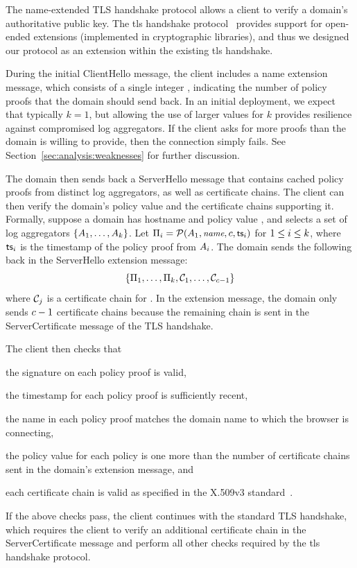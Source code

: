 The \ac{name}-extended TLS handshake protocol allows a client to verify a
domain's authoritative public key. The \ac{tls} handshake
protocol~\cite{rfc5246} provides support for open-ended extensions (implemented
in cryptographic libraries), and thus we designed our protocol as an extension
within the existing \ac{tls} handshake.

During the initial
  ClientHello message, the client includes a \ac{name} extension message, which
  consists of a single integer \numlas, indicating the number of policy proofs
  that the domain should send back.
In an initial deployment, we expect that typically $k=1$, but allowing the use
of larger values for $k$ provides resilience against compromised log
aggregators.  
If the client asks for more proofs than the domain is willing to provide,
then the connection simply fails.
See Section~\ref{sec:analysis:weaknesses} for further discussion.

The domain then sends back a ServerHello message that contains
cached policy proofs from \numlas distinct log aggregators, as well as \policy
certificate chains.  The client can then verify the domain's policy value
and the certificate chains supporting it. Formally, suppose a domain has
hostname \hostname and policy value \policy, and selects a set of log
aggregators $\{A_1, \ldots, A_k\}$. Let $\Pi_i =
\mathcal{P}(A_1, \small{\emph{name}}, c, \textsf{ts}_i)$ for $1 \le i \le
k$, where $\textsf{ts}_i$ is the timestamp of the policy proof from
$A_i$. The domain sends the following back in the ServerHello
extension message:
\begin{equation}
  \{\Pi_1, \ldots, \Pi_k, \mathcal{C}_1,
  \ldots, \mathcal{C}_{c - 1}\}
\end{equation}
where $\mathcal{C}_j$ is a certificate chain for \hostname. In the extension
message, the domain only sends $c - 1$ certificate chains because the
remaining chain is sent in the ServerCertificate message of the TLS
handshake.

The client then checks that
\begin{inparaenum}
\item the signature on each policy proof is valid,
\item the timestamp for each policy proof is sufficiently recent,
\item the name in each policy proof matches the domain name to which 
      the browser is connecting,
\item the policy value for each policy is one more than the number of
  certificate chains sent in the domain's extension message, and
\item each certificate chain is valid as specified in the X.509v3
  standard~\cite{rfc5280}.
\end{inparaenum}
If the above checks pass, the client continues with the standard TLS
handshake, which requires the client to verify an additional certificate chain
in the ServerCertificate message and perform all other checks required by the
\ac{tls} handshake protocol.

